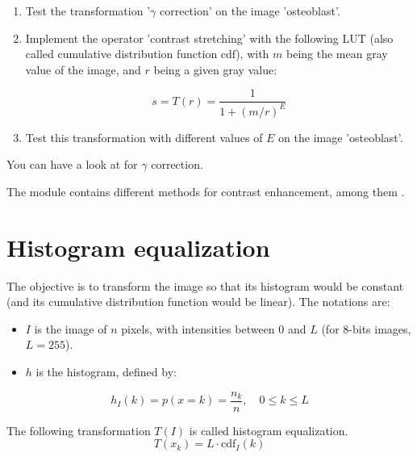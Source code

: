 \begin{qbox}
\begin{enumerate}
	\item Test the transformation '$\gamma$ correction' on the image 'osteoblast'.
	\item Implement the operator 'contrast stretching' with the following LUT (also called cumulative distribution function $\mathrm{cdf}$), with $m$ being the mean gray value of the image, and $r$ being a given gray value:
	
	$$
	s=T(r)=\frac{1}{1+(m/r)^E}
	$$
	
	\item Test this transformation with different values of $E$ on the image 'osteoblast'.
\end{enumerate}
\end{qbox}

\begin{mcomment}
\begin{mremark}
You can have a look at  for $\gamma$ correction.
\end{mremark}
\end{mcomment}

\begin{pcomment}
\begin{premark}
The module  contains different methods for contrast enhancement, among them .
\end{premark}
\end{pcomment}


\section{Histogram equalization}
The objective is to transform the image so that its histogram would be constant (and its cumulative distribution function would be linear).
The notations are:
\begin{itemize}  \item $I$ is the image of $n$ pixels, with intensities between $0$ and $L$ (for 8-bits images, $L=255$).
  \item $h$ is the histogram, defined by:
 \end{itemize}

$${\displaystyle h_I(k)=p(x=k)={\frac {n_{k}}{n}},\quad 0\leq k\leq L}$$

The following transformation $T(I)$ is called histogram equalization.
$${\displaystyle T(x_k)=L\cdot \mathrm{cdf}_I(k)} $$


